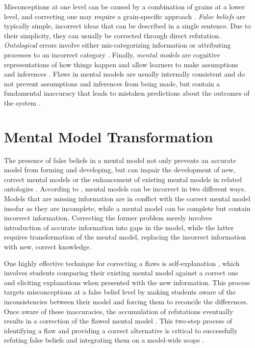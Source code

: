 Misconceptions at one level can be caused by a combination of grains at a lower level, and correcting one may require a grain-specific approach \citep{Gadgil2012}. \emph{False beliefs} are typically simple, incorrect ideas that can be described in a single sentence. Due to their simplicity, they can usually be corrected through direct refutation. \emph{Ontological} errors involve either mis-categorizing information or attributing processes to an incorrect category \citep{Chi1994}. Finally, \emph{mental models} are cognitive representations of how things happen \citep{Klein2006} and allow learners to make assumptions and inferences \citep{Gadgil2012}. Flaws in mental models are usually internally consistent and do not prevent assumptions and inferences from being made, but contain a fundamental inaccuracy that leads to mistaken predictions about the outcomes of the system \citep{Vosniadou1994}.

\section{Mental Model Transformation}

The presence of false beliefs in a mental model not only prevents an accurate model from forming and developing, but can impair the development of new, correct mental models or the enhancement of existing mental models in related ontologies \citep{Jacobson2013}. According to \citet{Chi2008}, mental models can be incorrect in two different ways. Models that are missing information are in conflict with the correct mental model insofar as they are incomplete, while a mental model can be complete but contain incorrect information. Correcting the former problem merely involves introduction of accurate information into gaps in the model, while the latter requires transformation of the mental model, replacing the incorrect information with new, correct knowledge.

One highly effective technique for correcting a flaws is self-explanation \citep{Chi1994}, which involves students comparing their existing mental model against a correct one and eliciting explanations when presented with the new information. This process targets misconceptions at a false belief level by making students aware of the inconsistencies between their model and forcing them to reconcile the differences. Once aware of these inaccuracies, the accumulation of refutations eventually results in a correction of the flawed mental model \citep{Chi2008}. This two-step process of identifying a flaw and providing a correct alternative is critical to successfully refuting false beliefs and integrating them on a model-wide scope \citep{Chi1994, Klein2006}.

